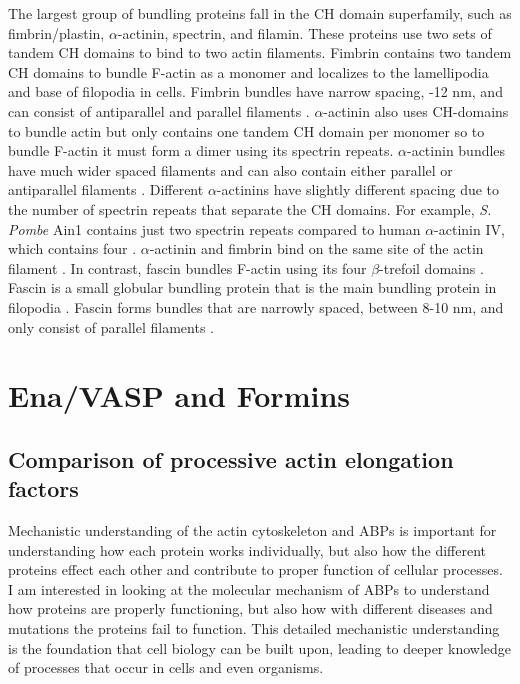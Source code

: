 The largest group of bundling proteins fall in the CH domain superfamily, such as fimbrin/plastin, $\alpha$-actinin, spectrin, and filamin. These proteins use two sets of tandem CH domains to bind to two actin filaments. Fimbrin contains two tandem CH domains to bundle F-actin as a monomer and localizes to the lamellipodia and base of filopodia in cells. Fimbrin bundles have narrow spacing, -12 nm, and can consist of antiparallel and parallel filaments \citep{hanein_atomic_1998}. $\alpha$-actinin also uses CH-domains to bundle actin but only contains one tandem CH domain per monomer so to bundle F-actin it must form a dimer using its spectrin repeats. $\alpha$-actinin bundles have much wider spaced filaments and can also contain either parallel or antiparallel filaments \citep{sjoblom_alpha-actinin_2008}. Different $\alpha$-actinins have slightly different spacing due to the number of spectrin repeats that separate the CH domains. For example, \textit{S. Pombe} Ain1 contains just two spectrin repeats compared to human $\alpha$-actinin IV, which contains four \citep{murphy_actinin_2015}. $\alpha$-actinin and fimbrin bind on the same site of the actin filament \citep{klein_structure_2004}. In contrast, fascin bundles F-actin using its four $\beta$-trefoil domains \citep{jansen_mechanism_2011}. Fascin is a small globular bundling protein that is the main bundling protein in filopodia \citep{vignjevic_role_2006,mellor_role_2010}. Fascin forms bundles that are narrowly spaced, between 8-10 nm, and only consist of parallel filaments \citep{edwards_fascins_1995,jansen_mechanism_2011,cant_drosophila_1994}. 

\section[Ena/VASP and Formins]{Ena/VASP and Formins\footnotemark}\label{ena-formin-review}


\subsection{Comparison of processive actin elongation factors}\label{comparison-why}

Mechanistic understanding of the actin cytoskeleton and ABPs is important for understanding how each protein works individually, but also how the different proteins effect each other and contribute to proper function of cellular processes. I am interested in looking at the molecular mechanism of ABPs to understand how proteins are properly functioning, but also how with different diseases and mutations the proteins fail to function. This detailed mechanistic understanding is the foundation that cell biology can be built upon, leading to deeper knowledge of processes that occur in cells and even organisms. 


